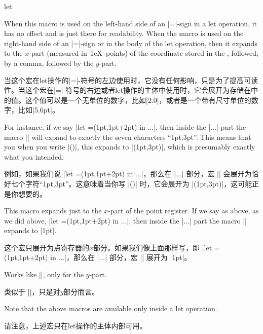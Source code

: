 \begin{pathoperation}{let}{
        }
    \begin{command}{\p{}}
        When this macro is used on the left-hand side of an |=|-sign in a let
        operation, it has no effect and is just there for readability. When the
        macro is used on the right-hand side of an |=|-sign or in the body of
        the let operation, then it expands to the $x$-part (measured in \TeX\
        points) of the coordinate stored in the , followed, by a
        comma, followed by the $y$-part.

        当这个宏在let操作的|=|-符号的左边使用时，它没有任何影响，只是为了提高可读性。当这个宏在|=|-符号的右边或者let操作的主体中使用时，它会展开为存储在中的值。这个值可以是一个无单位的数字，比如|2.0|，或者是一个带有尺寸单位的数字，比如|5.6pt|。


        For instance, if we say |let =(1pt,1pt+2pt) in ...|, then inside the
        |...| part the macro || will expand to exactly the seven characters
        ``1pt,3pt''. This means that you when you write |(\p1)|, this expands
        to |(1pt,3pt)|, which is presumably exactly what you intended.

        例如，如果我们说 |let =(1pt,1pt+2pt) in ...|，那么在 |...| 部分，宏 || 会展开为恰好七个字符``1pt,3pt''。这意味着当你写 |()| 时，它会展开为 |(1pt,3pt)|，这可能正是你想要的。


    \end{command}
    \begin{command}{\x{}}
        This macro expands just to the $x$-part of the point register. If we
        say as above, as we did above, |let \p1=(1pt,1pt+2pt) in ...|, then
        inside the |...| part the macro |\x1| expands to |1pt|.

        这个宏只展开为点寄存器的$x$部分。如果我们像上面那样写，即 |let =(1pt,1pt+2pt) in ...|，那么在 |...| 部分，宏 || 展开为 |1pt|。

    \end{command}
    \begin{command}{\y\marg{point register}}
        Works like |\x|, only for the $y$-part.

        类似于 |\x|，只是对$y$部分而言。

    \end{command}
    Note that the above macros are available only inside a let operation.

    请注意，上述宏只在let操作的主体内部可用。



\end{pathoperation}
